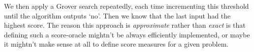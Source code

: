 We then apply a Grover search repeatedly, each time incrementing this threshold until the algorithm outputs `no'. Then we know that the last input had the highest score. The reason this approach is \textit{approximate} rather than \textit{exact} is that defining such a score-oracle mightn't be always efficiently implemented, or maybe it mightn't make sense at all to define score measures for a given problem.


